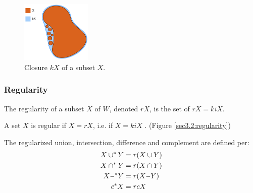 \documentclass[a4paper,11pt,oneside]{article}
\newcommand{\minus}{\scalebox{0.9}[1.0]{$-$}} %
\begin{document}
\begin{figure}[ht]
	\begin{center}
		\includegraphics[width=0.3\textwidth]{section3/3.2/closure.png}
	\end{center}
	\caption{Closure $kX$ of a subset $X$.}
	\label{sec3.2:closure}
\end{figure}
    
\subsubsection{Regularity}
    
\begin{definition}[Regularity]
	The regularity of a subset $X$ of $W$, denoted $rX$, is the set of $rX = kiX$. \cite{mansfield_1987}
\end{definition}
\begin{definition}
	A set $X$ is regular if $X = rX$, i.e. if $X = kiX$ \cite{mansfield_1987}. (Figure \ref{sec3.2:regularity}) 
\end{definition}
    
\begin{definition}
	The regularized union, intersection, difference and complement are defined per:
	\begin{align*} 
		X \cup^* Y   & = r(X \cup Y)    \\
		X \cap^* Y   & = r(X \cap Y)    \\
		X \minus^*Y & = r(X \minus Y) \\
		c{^*}X       & = rcX            
	\end{align*}
\end{definition}
    
\end{document}
